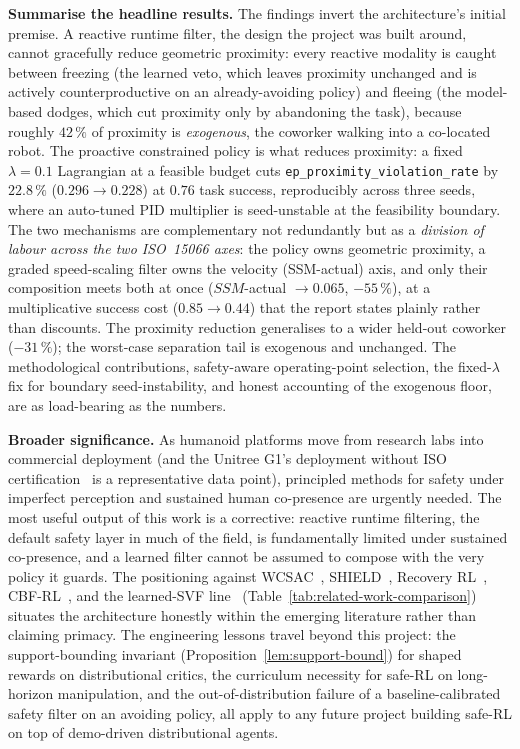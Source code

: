 \documentclass[11pt,a4paper]{report}
\newcommand{\ssm}{SSM}
\newcommand{\iso}{ISO~15066}
\begin{document}
\noindent
\textbf{Summarise the headline results.}
The findings invert the architecture's initial premise. A reactive
runtime filter, the design the project was built around, cannot
gracefully reduce geometric proximity: every reactive modality is
caught between freezing (the learned veto, which leaves proximity
unchanged and is actively counterproductive on an already-avoiding
policy) and fleeing (the model-based dodges, which cut proximity only
by abandoning the task), because roughly $42\,\%$ of proximity is
\emph{exogenous}, the coworker walking into a co-located robot. The
proactive constrained policy is what reduces proximity: a fixed
$\lambda = 0.1$ Lagrangian at a feasible budget cuts
\texttt{ep\_proximity\_violation\_rate} by $22.8\,\%$
($0.296 \rightarrow 0.228$) at $0.76$ task success, reproducibly
across three seeds, where an auto-tuned PID multiplier is seed-unstable
at the feasibility boundary. The two mechanisms are complementary not
redundantly but as a \emph{division of labour across the two \iso{}
axes}: the policy owns geometric proximity, a graded speed-scaling
filter owns the velocity (\ssm{}-actual) axis, and only their
composition meets both at once ($\ssm{}$-actual $\rightarrow 0.065$,
$-55\,\%$), at a multiplicative success cost ($0.85 \rightarrow 0.44$)
that the report states plainly rather than discounts. The proximity
reduction generalises to a wider held-out coworker
($-31\,\%$); the worst-case separation tail is exogenous and
unchanged. The methodological contributions, safety-aware operating-point
selection, the fixed-$\lambda$ fix for boundary seed-instability, and
honest accounting of the exogenous floor, are as load-bearing as the
numbers.

\noindent
\textbf{Broader significance.}
As humanoid platforms move from research labs into commercial
deployment (and the Unitree G1's deployment without ISO
certification~\cite{unitree_g1} is a representative data point),
principled methods for safety under imperfect perception and
sustained human co-presence are urgently needed. The most useful
output of this work is a corrective: reactive runtime filtering, the
default safety layer in much of the field, is fundamentally limited
under sustained co-presence, and a learned filter cannot be assumed to
compose with the very policy it guards. The positioning against
WCSAC~\cite{yang2021wcsac}, SHIELD~\cite{shield2025}, Recovery
RL~\cite{thananjeyan2021recovery}, CBF-RL~\cite{cbfrl2024}, and the
learned-SVF line~\cite{srinivasan2020learning}
(Table~\ref{tab:related-work-comparison}) situates the architecture
honestly within the emerging literature rather than claiming primacy.
The engineering lessons travel beyond this project: the
support-bounding invariant (Proposition~\ref{lem:support-bound}) for
shaped rewards on distributional critics, the curriculum necessity for
safe-RL on long-horizon manipulation, and the out-of-distribution
failure of a baseline-calibrated safety filter on an avoiding policy,
all apply to any future project building safe-RL on top of demo-driven
distributional agents.
\end{document}
